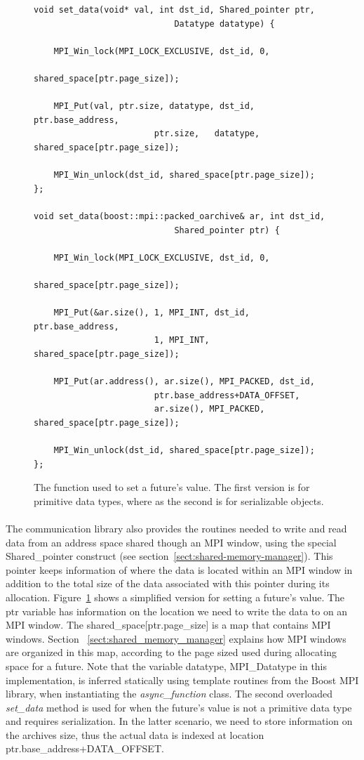 \begin{figure}[!ht]
\begin{lstlisting}
void set_data(void* val, int dst_id, Shared_pointer ptr, 
							Datatype datatype) {

    MPI_Win_lock(MPI_LOCK_EXCLUSIVE, dst_id, 0, 
								shared_space[ptr.page_size]);

    MPI_Put(val, ptr.size, datatype, dst_id, ptr.base_address, 
						ptr.size,	datatype, shared_space[ptr.page_size]);

    MPI_Win_unlock(dst_id, shared_space[ptr.page_size]);
};

void set_data(boost::mpi::packed_oarchive& ar, int dst_id, 
							Shared_pointer ptr) {

    MPI_Win_lock(MPI_LOCK_EXCLUSIVE, dst_id, 0, 
								shared_space[ptr.page_size]);

    MPI_Put(&ar.size(), 1, MPI_INT, dst_id, ptr.base_address,
						1, MPI_INT, shared_space[ptr.page_size]);

    MPI_Put(ar.address(), ar.size(), MPI_PACKED, dst_id, 
						ptr.base_address+DATA_OFFSET,
						ar.size(), MPI_PACKED, shared_space[ptr.page_size]);

    MPI_Win_unlock(dst_id, shared_space[ptr.page_size]);
};
\end{lstlisting}
\caption{The function used to set a future's value.  The first version is for primitive data types, 
where as the second is for serializable objects.}
\label{lst:set_data}
\end{figure}

\paragraph{}
The communication library also provides the routines needed to write and read data from an address space shared
though an MPI window, using the special Shared\_pointer construct (see section~\ref{sect:shared-memory-manager}).  
This pointer keeps information of where the data is located within an MPI window in addition to the total size of the data associated with this pointer during its allocation.  Figure~\ref{lst:set_data} shows a simplified version for 
setting a future's value.  The ptr variable has information on the location we need to write the data to on an MPI 
window.  The shared\_space[ptr.page\_size] is a map that contains MPI windows.  Section
~\ref{sect:shared_memory_manager} explains how MPI windows are organized in this map, according to the 
page sized used during allocating space for a future.  Note that the variable datatype, MPI\_Datatype in this
implementation, is inferred statically using template routines from the Boost MPI library,
when instantiating the \emph{async\_function} class.  The second overloaded \emph{set\_data} method is used for
when the future's value is not a primitive data type and requires serialization.  In the latter scenario, we
need to store information on the archives size, thus the actual data is indexed at location 
ptr.base\_address+DATA\_OFFSET.

